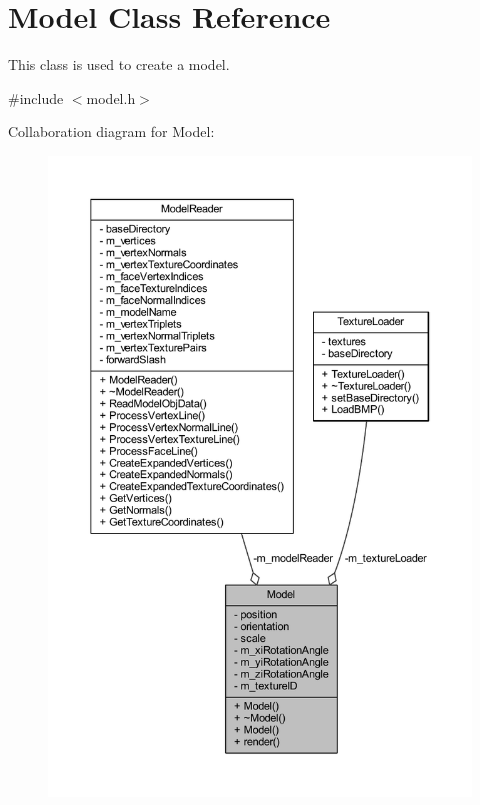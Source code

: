 \hypertarget{class_model}{}\section{Model Class Reference}
\label{class_model}


This class is used to create a model.  




{\ttfamily \#include $<$model.\+h$>$}



Collaboration diagram for Model\+:\nopagebreak
\begin{figure}[H]
\begin{center}
\leavevmode
\includegraphics[width=350pt]{class_model__coll__graph}
\end{center}
\end{figure}
